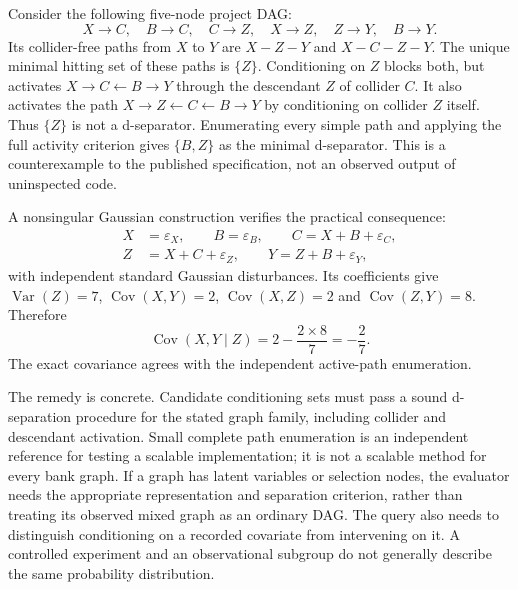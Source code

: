 Consider the following five-node project DAG:
\begin{equation}
 X\to C,\quad B\to C,\quad C\to Z,\quad X\to Z,
 \quad Z\to Y,\quad B\to Y.
\label{exec17:validity-graph}
\end{equation}
Its collider-free paths from $X$ to $Y$ are $X-Z-Y$ and $X-C-Z-Y$. The unique
minimal hitting set of these paths is $\{Z\}$. Conditioning on $Z$ blocks
both, but activates $X\to C\leftarrow B\to Y$ through the descendant
$Z$ of collider $C$. It also activates the path
$X\to Z\leftarrow C\leftarrow B\to Y$ by conditioning on collider $Z$
itself. Thus $\{Z\}$ is not a d-separator. Enumerating every simple path
and applying the full activity criterion gives $\{B,Z\}$ as the minimal
d-separator. This is a counterexample to the published specification, not an
observed output of uninspected code.\citep{exec17_advice_validity_exact}

A nonsingular Gaussian construction verifies the practical consequence:
\begin{equation}
\begin{split}
 X&=\varepsilon_X,\qquad B=\varepsilon_B,\qquad
 C=X+B+\varepsilon_C,\\
 Z&=X+C+\varepsilon_Z,\qquad Y=Z+B+\varepsilon_Y,
\end{split}
\label{exec17:validity-opened-scm}
\end{equation}
with independent standard Gaussian disturbances. Its coefficients give
$\operatorname{Var}(Z)=7$, $\operatorname{Cov}(X,Y)=2$,
$\operatorname{Cov}(X,Z)=2$ and $\operatorname{Cov}(Z,Y)=8$. Therefore
\begin{equation}
 \operatorname{Cov}(X,Y\mid Z)=2-\frac{2\times8}{7}=-\frac27.
\label{exec17:validity-opened-covariance}
\end{equation}
The exact covariance agrees with the independent active-path enumeration.
\citep{exec17_advice_validity_exact}

The remedy is concrete. Candidate conditioning sets must pass a sound
d-separation procedure for the stated graph family, including collider and
descendant activation. Small complete path enumeration is an independent
reference for testing a scalable implementation; it is not a scalable method
for every bank graph. If a graph has latent variables or selection nodes, the
evaluator needs the appropriate representation and separation criterion,
rather than treating its observed mixed graph as an ordinary DAG. The query
also needs to distinguish conditioning on a recorded covariate from
intervening on it. A controlled experiment and an observational subgroup do
not generally describe the same probability distribution.

